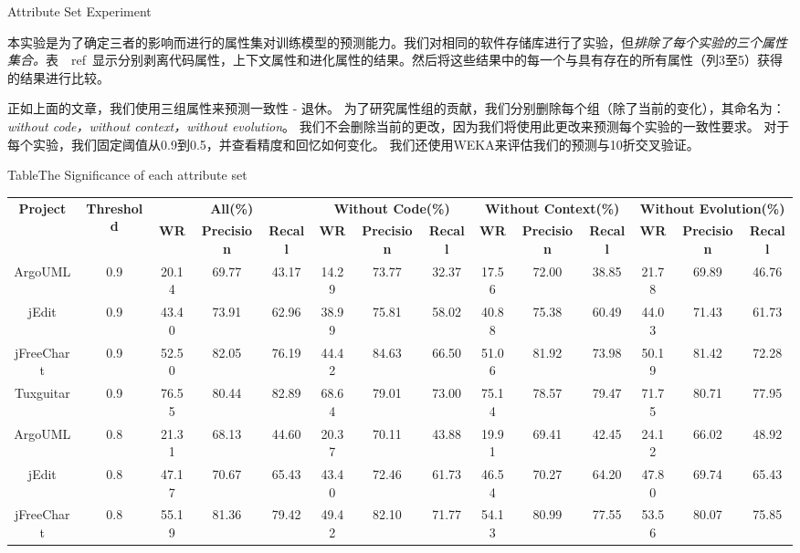 {
{Attribute Set Experiment}

本实验是为了确定三者的影响而进行的属性集对训练模型的预测能力。我们对相同的软件存储库进行了实验，但{\em 排除了每个实验的三个属性集合。}表~\ ref{}~显示分别剥离代码属性，上下文属性和进化属性的结果。然后将这些结果中的每一个与具有存在的所有属性（列3至5）获得的结果进行比较。

正如上面的文章，我们使用{三组属性}来预测一致性 - 退休。 为了研究属性组的贡献，我们分别删除每个组（除了当前的变化），其命名为：{\em without code，without context，without evolution}。 我们不会删除当前的更改，因为我们将使用此更改来预测每个实验的一致性要求。 对于每个实验，我们固定阈值从0.9到0.5，并查看精度和回忆如何变化。 我们还使用WEKA来评估我们的预测与10折交叉验证。

\begin{table}[htbp]
{Table$\!$}{The Significance of each attribute set}
\vspace{0.5em}\centering\wuhao
\begin{tabular}{cccccccccccccc}
\toprule[1.5pt]
\multirow{2}{*}{\textbf{Project}}&\multirow{2}{*}{\textbf{Threshold}}&\multicolumn{3}{c}{\textbf{All(\%)}}&\multicolumn{3}{c}{\textbf{Without Code(\%)}}&\multicolumn{3}{c}{\textbf{Without Context(\%)}}&\multicolumn{3}{c}{\textbf{Without Evolution(\%)}}\\
\cline{3-14}
&&\textbf{WR}&\textbf{Precision}&\textbf{Recall}&\textbf{WR}&\textbf{Precision}&\textbf{Recall}&\textbf{WR}&\textbf{Precision}&\textbf{Recall}&\textbf{WR}&\textbf{Precision}&\textbf{Recall}\\
\midrule[1pt]
ArgoUML&0.9&20.14&	69.77&	43.17&14.29&	73.77&	32.37&17.56&	72.00&	38.85&21.78&	69.89&	46.76\\
jEdit&0.9&	43.40&	73.91&	62.96&	38.99&	75.81&	58.02&	40.88&	75.38&	60.49&	44.03&	71.43&	61.73\\
jFreeChart&0.9&	52.50&	82.05&	76.19&	44.42&	84.63&	66.50&	51.06&	81.92&	73.98&	50.19&	81.42&	72.28\\
Tuxguitar&0.9&	76.55&	80.44&	82.89&	68.64&	79.01&	73.00&	75.14&	78.57&	79.47&	71.75&	80.71&	77.95\\
ArgoUML&0.8&	21.31&	68.13&	44.60&	20.37&	70.11&	43.88&	19.91&	69.41&	42.45&	24.12&	66.02&	48.92\\
jEdit&0.8&	47.17&	70.67&	65.43&	43.40&	72.46&	61.73&	46.54&	70.27&	64.20&	47.80&	69.74&	65.43\\
jFreeChart&0.8&	55.19&	81.36&	79.42&	49.42&	82.10&	71.77&	54.13&	80.99&	77.55&	53.56&	80.07&	75.85\\

\end{tabular}
\end{table}}
